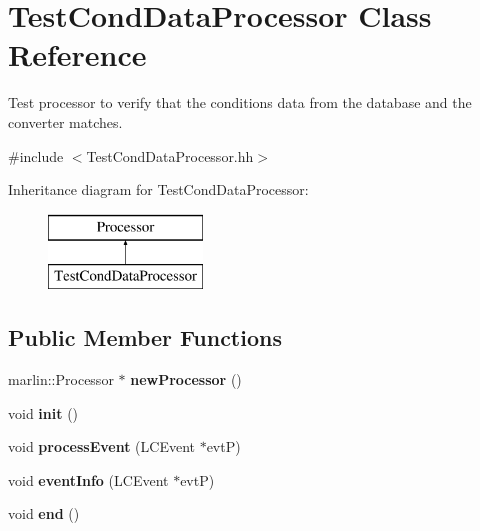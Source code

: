 \section{Test\-Cond\-Data\-Processor Class Reference}
\label{classTestCondDataProcessor}


Test processor to verify that the conditions data from the database and the converter matches.  




{\ttfamily \#include $<$Test\-Cond\-Data\-Processor.\-hh$>$}

Inheritance diagram for Test\-Cond\-Data\-Processor\-:\begin{figure}[H]
\begin{center}
\leavevmode
\includegraphics[height=2.000000cm]{classTestCondDataProcessor}
\end{center}
\end{figure}
\subsection*{Public Member Functions}
\begin{DoxyCompactItemize}
\item 
marlin\-::\-Processor $\ast$ {\bfseries new\-Processor} ()\label{classTestCondDataProcessor_a41bcc6ef81e323c404329239e3c91b33}

\item 
void {\bfseries init} ()\label{classTestCondDataProcessor_af8f6a10ec8f52851c570e0befe6a2cd6}

\item 
void {\bfseries process\-Event} (L\-C\-Event $\ast$evt\-P)\label{classTestCondDataProcessor_a64b807904fd307bce9c2ebd4a826a7a9}

\item 
void {\bfseries event\-Info} (L\-C\-Event $\ast$evt\-P)\label{classTestCondDataProcessor_a4b1593ba8eae5216c73375d958fc6ac0}

\item 
void {\bfseries end} ()\label{classTestCondDataProcessor_adf755fd78a25fa7582d147dd6b12a6ab}

\end{DoxyCompactItemize}
